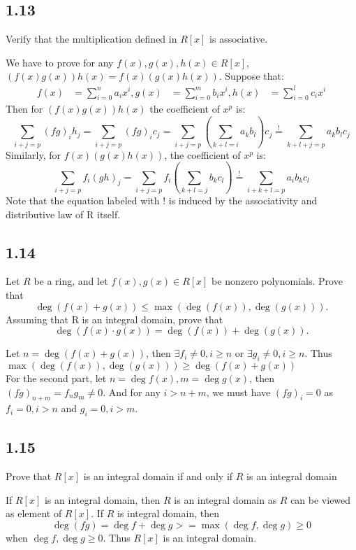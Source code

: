 \documentclass[a4paper, pdf, 12pt]{article}
\makeatletter
\renewenvironment{proof}[1][\proofname]{\par
  \pushQED{\qed}%
  \normalfont \topsep6\p@\@plus6\p@\relax
  \trivlist
  \item[%
    \hskip\labelsep
    \normalfont\bfseries %
    #1%
    \@addpunct{.}%
  ]\ignorespaces
}{%
  \popQED\endtrivlist\@endpefalse
}
\let\qed\relax %
\DeclareRobustCommand{\qed}{%
  \ifmmode \mathqed
  \else
    \leavevmode\unskip\penalty\@M\hbox{}\nobreak\hspace{.5em minus .1em}%
    \hbox{\qedsymbol}%
  \fi
}
\makeatother
\begin{document}
\subsection*{1.13}
Verify that the multiplication deﬁned in $R[x]$ is associative.
\begin{proof}
  We have to prove for any $f(x), g(x), h(x)\in R[x]$, $(f(x)g(x))h(x) = f(x)(g(x)h(x))$. 
  Suppose that:
  $$
  \begin{aligned}
    f(x) &= \sum_{i=0}^{n}a_{i}x^{i},
    g(x) &= \sum_{i=0}^{m}b_{i}x^{i},
    h(x) &= \sum_{i=0}^{l}c_{i}x^{i}
  \end{aligned}
  $$
  Then for $(f(x)g(x))h(x)$ the coefficient of $x^{p}$ is:
  $$
  \sum_{i+j=p}(fg)_{i}h_{j} = \sum_{i+j=p}(fg)_{i}c_{j}=\sum_{i+j=p}(\sum_{k+l=i}a_{k}b_{l})c_{j}\stackrel{!}{=}\sum_{k+l+j=p}a_kb_lc_j
  $$
  Similarly, for $f(x)(g(x)h(x))$, the coefficient of $x^{p}$ is:
  $$
  \sum_{i+j=p}f_{i}(gh)_{j}=\sum_{i+j=p}f_{i}(\sum_{k+l=j}b_kc_l)\stackrel{!}{=}\sum_{i+k+l=p}a_{i}b_{k}c_{l}
  $$
  Note that the equation labeled with $!$ is induced by the associativity and distributive law of R itself.
\end{proof}

\subsection*{1.14}
Let $R$ be a ring, and let $f(x), g(x) \in R[x]$ be nonzero polynomials. Prove that 
$$
\deg(f(x) + g(x)) \leq \max(\deg(f(x)), \deg(g(x))) .
$$
\noindent
Assuming that R is an integral domain, prove that
$$
\deg(f(x) · g(x)) = \deg(f(x)) + \deg(g(x)).
$$
\begin{proof}
  Let $n=\deg (f(x) + g(x))$, then $\exists f_{i}\neq 0, i\geq n$ or $\exists g_{i}\neq 0, i\geq n$. Thus 
  $\max(\deg(f(x)), \deg(g(x)))\geq \deg (f(x) + g(x))$\\

  For the second part, let $n=\deg f(x), m=\deg g(x)$, then $(fg)_{n+m} = f_{n}g_{m}\neq 0$. And for any $i > n+m$, 
  we must have $(fg)_{i} = 0$ as $f_{i} = 0, i > n$ and $g_{i} = 0, i > m$.
\end{proof}

\subsection*{1.15}
Prove that $R[x]$ is an integral domain if and only if $R$ is an integral domain
\begin{proof}
  If $R[x]$ is an integral domain, then $R$ is an integral domain as $R$ can be viewed as 
  element of $R[x]$. If $R$ is integral domain, then $$\deg (fg) = \deg f + \deg g >= \max (\deg f, \deg g) \geq 0$$ 
  when $\deg f,\deg g\geq 0$. Thus $R[x]$ is an integral domain.
\end{proof}
\end{document}
